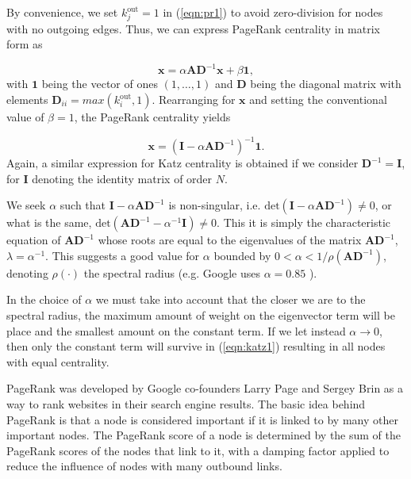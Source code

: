 By convenience, we set $k_j^{\text{out}}=1$ in (\ref{eqn:pr1}) to avoid zero-division for nodes with no outgoing edges. Thus, we can express PageRank centrality in matrix form as

\begin{equation}
\label{eqn:pr2}
    \mathbf{x} = \alpha\mathbf{AD}^{-1}\mathbf{x} + \beta \mathbf{1},
\end{equation}
with $\mathbf{1}$ being the vector of ones $(1,\dots,1)$ and $\mathbf{D}$ being the diagonal matrix with elements $\mathbf{D}_{ii} = max(k_i^{\text{out}},1)$. Rearranging for $\mathbf{x}$ and setting the conventional value of $\beta=1$, the PageRank centrality yields

\begin{equation}
\label{eqn:pr3}
    \mathbf{x} = (\mathbf{I} - \alpha\mathbf{AD}^{-1})^{-1} \mathbf{1}.
\end{equation}
Again, a similar expression for Katz centrality is obtained if we consider $\mathbf{D}^{-1}= \mathbf{I}$, for $\mathbf{I}$ denoting the identity matrix of order $N$.

We seek $\alpha$ such that $\mathbf{I}-\alpha\mathbf{AD}^{-1}$ is non-singular, i.e. $\text{det}(\mathbf{I}-\alpha\mathbf{AD}^{-1})\neq 0$, or what is the same, $\text{det}(\mathbf{AD}^{-1}-\alpha^{-1}\mathbf{I})\neq 0$. This it is simply the characteristic equation of $\mathbf{AD}^{-1}$ whose roots are equal to the eigenvalues of the matrix $\mathbf{AD}^{-1}$, $\lambda=\alpha^{-1}$. This suggests a good value for $\alpha$ bounded by $0 < \alpha < 1/\rho(\mathbf{AD}^{-1})$, denoting $\rho(\cdot)$ the spectral radius (e.g. Google uses $\alpha = 0.85$ \cite{brin1998anatomy}). 

In the choice of $\alpha$ we must take into account that the closer we are to the spectral radius, the maximum amount of weight on the eigenvector term will be place and the smallest amount on the constant term. If we let instead $\alpha\to 0$, then only the constant term will survive in (\ref{eqn:katz1}) resulting in all nodes with equal centrality.

PageRank was developed by Google co-founders Larry Page and Sergey Brin as a way to rank websites in their search engine results. The basic idea behind PageRank is that a node is considered important if it is linked to by many other important nodes. The PageRank score of a node is determined by the sum of the PageRank scores of the nodes that link to it, with a damping factor applied to reduce the influence of nodes with many outbound links. 

